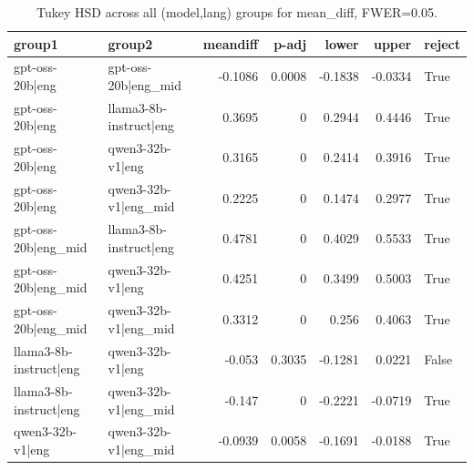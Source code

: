 \begin{table}
\caption{Tukey HSD across all (model,lang) groups for mean_diff, FWER=0.05.}
\label{tab:tukey_all_models_all_langs_mean_diff}
\begin{tabular}{l l r r r r l}
\toprule
group1 & group2 & meandiff & p-adj & lower & upper & reject \\
\midrule
gpt-oss-20b|eng & gpt-oss-20b|eng_mid & -0.1086 & 0.0008 & -0.1838 & -0.0334 & True \\
gpt-oss-20b|eng & llama3-8b-instruct|eng & 0.3695 & 0 & 0.2944 & 0.4446 & True \\
gpt-oss-20b|eng & qwen3-32b-v1|eng & 0.3165 & 0 & 0.2414 & 0.3916 & True \\
gpt-oss-20b|eng & qwen3-32b-v1|eng_mid & 0.2225 & 0 & 0.1474 & 0.2977 & True \\
gpt-oss-20b|eng_mid & llama3-8b-instruct|eng & 0.4781 & 0 & 0.4029 & 0.5533 & True \\
gpt-oss-20b|eng_mid & qwen3-32b-v1|eng & 0.4251 & 0 & 0.3499 & 0.5003 & True \\
gpt-oss-20b|eng_mid & qwen3-32b-v1|eng_mid & 0.3312 & 0 & 0.256 & 0.4063 & True \\
llama3-8b-instruct|eng & qwen3-32b-v1|eng & -0.053 & 0.3035 & -0.1281 & 0.0221 & False \\
llama3-8b-instruct|eng & qwen3-32b-v1|eng_mid & -0.147 & 0 & -0.2221 & -0.0719 & True \\
qwen3-32b-v1|eng & qwen3-32b-v1|eng_mid & -0.0939 & 0.0058 & -0.1691 & -0.0188 & True \\
\bottomrule
\end{tabular}
\end{table}
